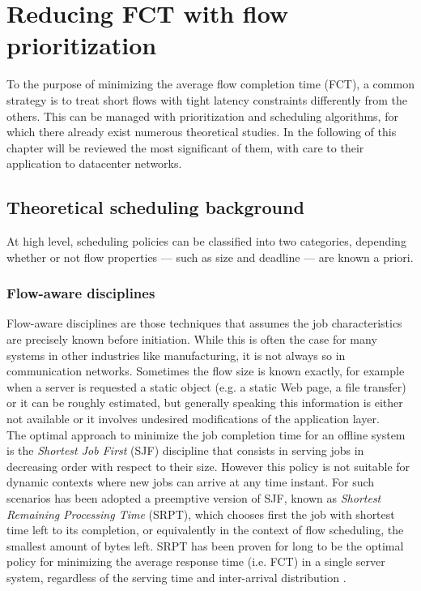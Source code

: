 \chapter{Reducing FCT with flow prioritization}

To the purpose of minimizing the average flow completion time (FCT), a common strategy is to treat short flows with tight latency constraints differently from the others. This can be managed with prioritization and scheduling algorithms, for which there already exist numerous theoretical studies. In the following of this chapter will be reviewed the most significant of them, with care to their application to datacenter networks. 

\section{Theoretical scheduling background}
At high level, scheduling policies can be classified into two categories, depending whether or not flow properties --- such as size and deadline --- are known a priori.

\subsection{Flow-aware disciplines}
Flow-aware disciplines are those techniques that assumes the job characteristics are precisely known before initiation. While this is often the case for many systems in other industries like manufacturing, it is not always so in communication networks. Sometimes the flow size is known exactly, for example when a server is requested a static object (e.g. a static Web page, a file transfer) or it can be roughly estimated, but generally speaking this information is either not available or it involves undesired modifications of the application layer. \\
The optimal approach to minimize the job completion time for an offline system is the \emph{Shortest Job First} (SJF) discipline that consists in serving jobs in decreasing order with respect to their size. However this policy is not suitable for dynamic contexts where new jobs can arrive at any time instant. For such scenarios has been adopted a preemptive version of SJF, known as \emph{Shortest Remaining Processing Time} (SRPT), which chooses first the job with shortest time left to its completion, or equivalently in the context of flow scheduling, the smallest amount of bytes left. SRPT has been proven for long to be the optimal policy for minimizing the average response time (i.e. FCT) in a single server system, regardless of the serving time and inter-arrival distribution \cite{schrage_1968}. 

